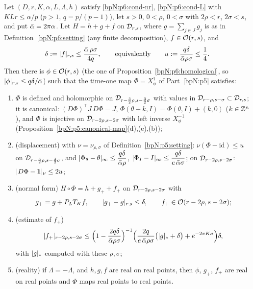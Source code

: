 \begin{theorem}\label{bpN:p6:iterative}
Let $(D,r,K,\alpha,L,\Lambda,h)$ satisfy \ref{bpN:p6:cond-nr}, \ref{bpN:p6:cond-L} with $KLr\le\alpha/p$ ($p>1$, $q=p/(p-1)$), let $s>0$, $0<\rho$, $0<\sigma$ with $2\rho<r$, $2\sigma<s$, and put $\bar\alpha=2\pi\alpha$. Let $H=h+g+f$ on $\mathcal D_{r,s}$, where $g=\sum_{j\in J}g_j$ is as in Definition~\ref{bpN:p6:setting} (any finite decomposition), $f\in\mathcal O(r,s)$, and
\[\delta:=\lvert f\rvert_{r,s}\le\frac{\bar\alpha\,\rho\sigma}{4q},\qquad\text{equivalently}\qquad u:=\frac{q\delta}{\bar\alpha\rho\sigma}\le\frac14 .\]
Then there is $\phi\in\mathcal O(r,s)$ (the one of Proposition~\ref{bpN:p6:homological}, so $\lvert \phi\rvert_{r,s}\le q\delta/\bar\alpha$) such that the time-one map $\Phi=X^1_\phi$ of Part~\ref{bpN:p5} satisfies:
\begin{enumerate}[label=(\alph*)]
\item $\Phi$ is defined and holomorphic on $\mathcal D_{r-\frac32\rho,s-\frac32\sigma}$ with values in $\mathcal D_{r-\rho,s-\sigma}\subset\mathcal D_{r,s}$; it is canonical: $(D\Phi)^\top J\,D\Phi=J$, $\Phi(\theta+k,I)=\Phi(\theta,I)+(k,0)$ ($k\in\mathbb{Z}^n$), and $\Phi$ is injective on $\mathcal D_{r-2\rho,s-2\sigma}$ with left inverse $X^{-1}_\phi$ (Proposition~\ref{bpN:p5:canonical-map}(d),(e),(b));
\item (displacement) with $\nu=\nu_{\rho,\sigma}$ of Definition~\ref{bpN:p5:setting}: $\nu(\Phi-\mathrm{id})\le u$ on $\mathcal D_{r-\frac32\rho,s-\frac32\sigma}$, and $\lvert \Phi_\theta-\theta\rvert_\infty\le\dfrac{q\delta}{\bar\alpha\rho}$, $\lvert \Phi_I-I\rvert_\infty\le\dfrac{q\delta}{e\,\bar\alpha\sigma}$; on $\mathcal D_{r-2\rho,s-2\sigma}$: $\lvert D\Phi-\mathbf 1\rvert_\nu\le2u$;
\item (normal form) $H\circ\Phi=h+g_++f_+$ on $\mathcal D_{r-2\rho,s-2\sigma}$ with
\[g_+=g+P_\Lambda T_Kf,\qquad \lvert g_+-g\rvert_{r,s}\le\delta,\qquad f_+\in\mathcal O(r-2\rho,s-2\sigma);\]
\item (estimate of $f_+$)
\[\lvert f_+\rvert_{r-2\rho,s-2\sigma}\le\Bigl(1-\frac{2q\delta}{\bar\alpha\rho\sigma}\Bigr)^{-1}\Bigl(\frac{2q}{e\,\bar\alpha\rho\sigma}\bigl(\lvert g\rvert_*+\delta\bigr)+e^{-2\pi K\sigma}\Bigr)\delta,\]
with $\lvert g\rvert_*$ computed with these $\rho,\sigma$;
\item (reality) if $\Lambda=-\Lambda$, and $h,g,f$ are real on real points, then $\phi$, $g_+$, $f_+$ are real on real points and $\Phi$ maps real points to real points.
\end{enumerate}
\end{theorem}
